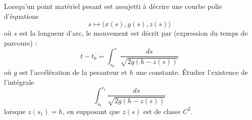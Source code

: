 

\begin{exercice}\label{exo_I-2-4}

Lorsqu'un point matériel pesant est assujetti à décrire une courbe polie d'équations
\begin{equation}
	s\mapsto\big( x(s),y(s),z(s) \big)
\end{equation}
où $s$ est la longueur d'arc, le mouvement est décrit par (expression du temps de parcours) :
\begin{equation}
	t-t_0=\int_{s_0}^s\frac{ ds }{ \sqrt{ 2g(h-z(s)) } }
\end{equation}
où $g$ est l'accélération de la pesanteur et $h$ une constante. Étudier l'existence de l'intégrale 
\begin{equation}
	\int_{s_0}^{s_1}  \frac{ ds }{ \sqrt{ 2g(h-z(s)) } }
\end{equation}
lorsque $z(s_1)=h$, en supposant que $z(s)$ est de classe $C^2$.

\end{exercice}
